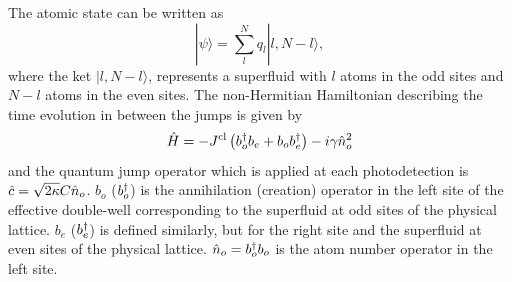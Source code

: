 The atomic state can be written as
\begin{equation}
  \label{eq:discretepsi}
  | \psi \rangle = \sum_l^N q_l |l, N - l \rangle,
\end{equation}
where the ket $| l, N - l \rangle$, represents a superfluid with $l$
atoms in the odd sites and $N-l$ atoms in the even sites. The
non-Hermitian Hamiltonian describing the time evolution in between the
jumps is given by
\begin{equation}
  \label{eq:doublewell}
  \hat{H} = -J^\mathrm{cl} \left( b^\dagger_o b_e + b_o b^\dagger_e \right) - i
  \gamma \hat{n}_o^2
\end{equation}
and the quantum jump operator which is applied at each photodetection
is $\hat{c} = \sqrt{2 \kappa} C \hat{n}_o$. $b_o$ ($b^\dagger_o$) is the annihilation
(creation) operator in the left site of the effective double-well
corresponding to the superfluid at odd sites of the physical
lattice. $b_e$ ($b^\dagger_e$) is defined similarly, but for the right site
and the superfluid at even sites of the physical lattice.
$\hat{n}_o = b^\dagger_o b_o$ is the atom number operator in the left site.

